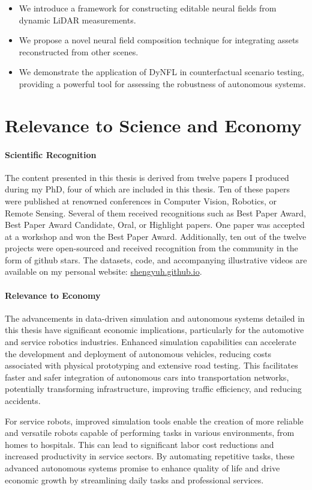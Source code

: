 \begin{itemize}
\item We introduce a framework for constructing editable neural fields from dynamic LiDAR measurements.
\item We propose a novel neural field composition technique for integrating assets reconstructed from other scenes.
\item We demonstrate the application of DyNFL in counterfactual scenario testing, providing a powerful tool for assessing the robustness of autonomous systems.
\end{itemize}

\section{Relevance to Science and Economy}
\paragraph{Scientific Recognition}
The content presented in this thesis is derived from twelve papers I produced during my PhD, four of which are included in this thesis. Ten of these papers were published at renowned conferences in Computer Vision, Robotics, or Remote Sensing. Several of them received recognitions such as Best Paper Award, Best Paper Award Candidate, Oral, or Highlight papers. One paper was accepted at a workshop and won the Best Paper Award. Additionally, ten out of the twelve projects were open-sourced and received recognition from the community in the form of github stars. The datasets, code, and accompanying illustrative videos are available on my personal website: \url{shengyuh.github.io}.

\paragraph{Relevance to Economy}
The advancements in data-driven simulation and autonomous systems detailed in this thesis have significant economic implications, particularly for the automotive and service robotics industries. Enhanced simulation capabilities can accelerate the development and deployment of autonomous vehicles, reducing costs associated with physical prototyping and extensive road testing. This facilitates faster and safer integration of autonomous cars into transportation networks, potentially transforming infrastructure, improving traffic efficiency, and reducing accidents.

For service robots, improved simulation tools enable the creation of more reliable and versatile robots capable of performing tasks in various environments, from homes to hospitals. This can lead to significant labor cost reductions and increased productivity in service sectors. By automating repetitive tasks, these advanced autonomous systems promise to enhance quality of life and drive economic growth by streamlining daily tasks and professional services.